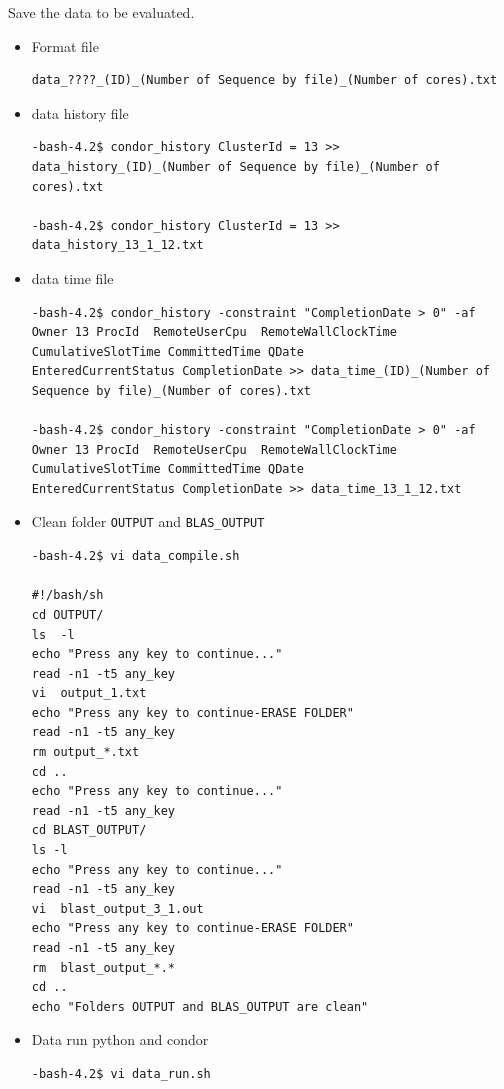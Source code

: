 \documentclass{article}
\begin{document}
Save the data to be evaluated. 
\begin{itemize}
\item Format file
\begin{verbatim}
data_????_(ID)_(Number of Sequence by file)_(Number of cores).txt
\end{verbatim}
\normalsize
\item data history file
\tiny
\begin{verbatim}
-bash-4.2$ condor_history ClusterId = 13 >> data_history_(ID)_(Number of Sequence by file)_(Number of cores).txt

-bash-4.2$ condor_history ClusterId = 13 >> data_history_13_1_12.txt
\end{verbatim}
\normalsize
\item data time file
\tiny
\begin{verbatim}
-bash-4.2$ condor_history -constraint "CompletionDate > 0" -af Owner 13 ProcId  RemoteUserCpu  RemoteWallClockTime CumulativeSlotTime CommittedTime QDate
EnteredCurrentStatus CompletionDate >> data_time_(ID)_(Number of Sequence by file)_(Number of cores).txt

-bash-4.2$ condor_history -constraint "CompletionDate > 0" -af Owner 13 ProcId  RemoteUserCpu  RemoteWallClockTime CumulativeSlotTime CommittedTime QDate
EnteredCurrentStatus CompletionDate >> data_time_13_1_12.txt
\end{verbatim}
\normalsize

\item Clean folder \verb+OUTPUT+ and \verb+BLAS_OUTPUT+
\tiny
\begin{verbatim}
-bash-4.2$ vi data_compile.sh 

#!/bash/sh
cd OUTPUT/
ls  -l
echo "Press any key to continue..."
read -n1 -t5 any_key
vi  output_1.txt
echo "Press any key to continue-ERASE FOLDER"
read -n1 -t5 any_key
rm output_*.txt
cd ..
echo "Press any key to continue..."
read -n1 -t5 any_key
cd BLAST_OUTPUT/
ls -l
echo "Press any key to continue..."
read -n1 -t5 any_key
vi  blast_output_3_1.out
echo "Press any key to continue-ERASE FOLDER"
read -n1 -t5 any_key
rm  blast_output_*.*
cd ..
echo "Folders OUTPUT and BLAS_OUTPUT are clean"
\end{verbatim}
\normalsize
\item Data run python and condor
\tiny
\begin{verbatim}
-bash-4.2$ vi data_run.sh 


\end{verbatim}
\end{itemize}
\end{document}
